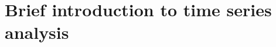 
\chapter{Brief introduction to time series analysis}
\label{chap:Brief introduction to time series analysis}
